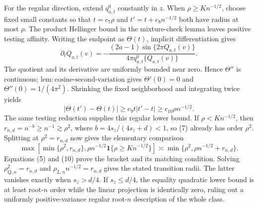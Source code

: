 For the regular direction, extend \(q_{a,t}^0\) constantly in \(z\). When \(\rho\ge Kn^{-1/2}\), choose fixed small constants so that \(t=c_7\rho\) and \(t'=t+c_8n^{-1/2}\) both have radius at most \(\rho\). The product Hellinger bound in the mixture-check lemma leaves positive testing affinity. Writing the endpoint as \(\Theta(t)\), implicit differentiation gives
\[
\partial_tQ_{a,t}(v)
=-\frac{(2a-1)\sin\{2\pi Q_{a,t}(v)\}}{4\pi q_{a,t}^0\{Q_{a,t}(v)\}}. \tag{8}
\]
The quotient and its derivative are uniformly bounded near zero. Hence \(\Theta''\) is continuous; \(\mathrm{lem{:}cosine\text{-}second\text{-}variation}\) gives \(\Theta'(0)=0\) and \(\Theta''(0)=1/(4\pi^2)\). Shrinking the fixed neighborhood and integrating twice yields
\[
|\Theta(t')-\Theta(t)|\ge c_9t|t'-t|\ge c_{10}\rho n^{-1/2}.         \tag{9}
\]
The same testing reduction supplies this regular lower bound. If \(\rho<Kn^{-1/2}\), then \(r_{n,d}=n^{-b}\ge n^{-1}\gtrsim\rho^2\), where \(b=4s_z/(4s_z+d)<1\), so (7) already has order \(\rho^2\). Splitting at \(\rho^2=r_{n,d}\) now gives the elementary comparison
\[
\max\!\left[\min\{\rho^2,r_{n,d}\},\rho n^{-1/2}\mathbf1\{\rho\ge Kn^{-1/2}\}\right]
\asymp\min\{\rho^2,\rho n^{-1/2}+r_{n,d}\}.                        \tag{10}
\]
Equations (5) and (10) prove the bracket and its matching condition. Solving \(\rho_{Q,n}^2=r_{n,d}\) and \(\rho_{L,n}n^{-1/2}=r_{n,d}\) gives the stated transition radii. The latter vanishes exactly when \(s_z>d/4\). If \(s_z\le d/4\), the equality quadratic lower bound is at least root-\(n\) order while the linear projection is identically zero, ruling out a uniformly positive-variance regular root-\(n\) description of the whole class.